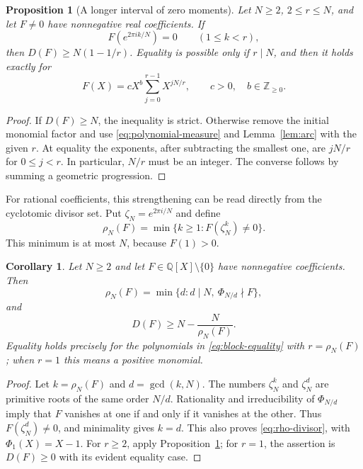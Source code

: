 \documentclass[11pt]{article}
\newtheorem{proposition}[theorem]{Proposition}
\newtheorem{corollary}[theorem]{Corollary}
\theoremstyle{definition}
\theoremstyle{remark}
\numberwithin{equation}{section}
\newcommand{\NN}{\mathbb Z_{\ge0}}
\begin{document}
\begin{proposition}[A longer interval of zero moments]\label{prop:block}
Let $N\ge2$, $2\le r\le N$, and let $F\ne0$ have nonnegative real
coefficients. If
\begin{equation}\label{eq:block}
 F(e^{2\pi ik/N})=0\qquad(1\le k<r),
\end{equation}
then $D(F)\ge N(1-1/r)$. Equality is possible only if $r\mid N$, and
then it holds exactly for
\begin{equation}\label{eq:block-equality}
 F(X)=cX^b\sum_{j=0}^{r-1}X^{jN/r},\qquad c>0,\quad b\in\NN.
\end{equation}
\end{proposition}

\begin{proof}
If $D(F)\ge N$, the inequality is strict. Otherwise remove the initial
monomial factor and use \eqref{eq:polynomial-measure} and
Lemma~\ref{lem:arc} with the given
$r$. At equality the exponents, after subtracting the smallest one,
are $jN/r$ for $0\le j<r$. In particular, $N/r$ must be an integer.
The converse follows by summing a geometric progression.
\end{proof}

For rational coefficients, this strengthening can be read directly from
the cyclotomic divisor set. Put $\zeta_N=e^{2\pi i/N}$ and define
\begin{equation}\label{eq:rho}
 \rho_N(F)=\min\{k\ge1:F(\zeta_N^k)\ne0\}.
\end{equation}
This minimum is at most $N$, because $F(1)>0$.

\begin{corollary}\label{cor:rho}
Let $N\ge2$ and let $F\in\mathbb Q[X]\setminus\{0\}$ have nonnegative coefficients.
Then
\begin{equation}\label{eq:rho-divisor}
 \rho_N(F)=\min\{d:d\mid N,\ \Phi_{N/d}\nmid F\},
\end{equation}
and
\begin{equation}\label{eq:rho-bound}
 D(F)\ge N-\frac{N}{\rho_N(F)}.
\end{equation}
Equality holds precisely for the polynomials in
\eqref{eq:block-equality} with $r=\rho_N(F)$; when $r=1$ this means
a positive monomial.
\end{corollary}

\begin{proof}
Let $k=\rho_N(F)$ and $d=\gcd(k,N)$. The numbers $\zeta_N^k$ and
$\zeta_N^d$ are primitive roots of the same order $N/d$.
Rationality and irreducibility of $\Phi_{N/d}$ imply that $F$ vanishes
at one if and only if it vanishes at the other. Thus
$F(\zeta_N^d)\ne0$, and minimality gives $k=d$.
This also proves \eqref{eq:rho-divisor}, with $\Phi_1(X)=X-1$.
For $r\ge2$, apply Proposition~\ref{prop:block}; for $r=1$, the
assertion is $D(F)\ge0$ with its evident equality case.
\end{proof}
\end{document}
